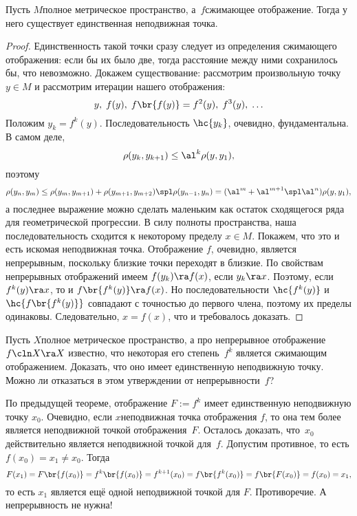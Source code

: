 \documentclass[a4paper]{article}
\begin{document}
\begin{theorem}
Пусть $M$\т полное метрическое пространство, а~$f$\т сжимающее отображение.
Тогда у него существует единственная неподвижная точка.
\end{theorem}
\begin{proof}
Единственность такой точки сразу следует из определения сжимающего отображения: если бы их было две,
тогда расстояние между ними сохранилось бы, что невозможно. Докажем существование:
рассмотрим произвольную точку $y \in M$ и рассмотрим итерации нашего отображения:
$$y,\; f(y),\;  f\br{f(y)} = f^2(y),\;  f^3(y),\;  \ldots$$
Положим $y_k = f^k(y)$. Последовательность $\hc{y_k}$, очевидно, фундаментальна. В самом деле,
$$\rho(y_k, y_{k+1}) \le \al^k\rho(y, y_1),$$
поэтому
$$
  \rho(y_n, y_m) \le \rho(y_m, y_{m+1}) + \rho(y_{m+1}, y_{m+2})\spl \rho(y_{n-1}, y_n)=
  (\al^m + \al^{m+1} \spl \al^n)\rho(y,y_1),
$$
а последнее выражение можно сделать маленьким как остаток сходящегося ряда для геометрической прогрессии.
В силу полноты пространства, наша последовательность сходится к некоторому пределу $x \in M$.
Покажем, что это и есть искомая неподвижная точка.
Отображение $f$, очевидно, является непрерывным, поскольку близкие точки переходят в близкие.
По свойствам непрерывных отображений имеем $f(y_k) \ra f(x)$, если $y_k \ra x$. Поэтому,
если $f^k(y) \ra x$, то и $f\br{f^k(y)} \ra f(x)$. Но последовательности
$\hc{f^k(y)}$ и $\hc{f\br{f^k(y)}}$ совпадают с точностью до первого члена, поэтому их пределы
одинаковы. Следовательно, $x = f(x)$, что и требовалось доказать.
\end{proof}

\begin{problem}
Пусть $X$\т полное метрическое пространство, а про непрерывное отображение $f\cln X \ra X$ известно,
что некоторая его степень~$f^k$ является сжимающим отображением. Доказать, что оно имеет
единственную неподвижную точку. Можно ли отказаться в этом утверждении от непрерывности~$f$?
\end{problem}
\begin{solution}
По предыдущей теореме, отображение $F := f^k$ имеет единственную неподвижную точку $x_0$.
Очевидно, если $x$\т неподвижная точка отображения $f$, то она тем более является неподвижной
точкой отображения~$F$. Осталось доказать, что~$x_0$ действительно является неподвижной точкой
для~$f$. Допустим противное, то есть $f(x_0) = x_1 \neq x_0$. Тогда
$$F(x_1) = F\br{f(x_0)} = f^k\br{f(x_0)} = f^{k+1}(x_0) = f\br{f^k(x_0)} = f\br{F(x_0)} = f(x_0) = x_1,$$
то есть $x_1$ является ещё одной неподвижной точкой для $F$. Противоречие. А непрерывность не нужна!
\end{solution}
\end{document}
